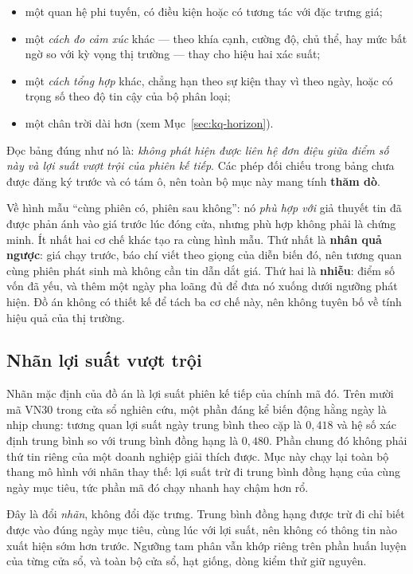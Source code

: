 \begin{itemize}[nosep]
  \item một quan hệ phi tuyến, có điều kiện hoặc có tương tác với đặc trưng giá;
  \item một \emph{cách đo cảm xúc} khác --- theo khía cạnh, cường độ, chủ thể, hay mức bất
        ngờ so với kỳ vọng thị trường --- thay cho hiệu hai xác suất;
  \item một \emph{cách tổng hợp} khác, chẳng hạn theo sự kiện thay vì theo ngày, hoặc có
        trọng số theo độ tin cậy của bộ phân loại;
  \item một chân trời dài hơn (xem Mục~\ref{sec:kq-horizon}).
\end{itemize}

Đọc bảng đúng như nó là: \emph{không phát hiện được liên hệ đơn điệu giữa điểm số này và
lợi suất vượt trội của phiên kế tiếp}. Các phép đối chiếu trong bảng chưa được đăng ký
trước và có tám ô, nên toàn bộ mục này mang tính \textbf{thăm dò}.

Về hình mẫu ``cùng phiên có, phiên sau không'': nó \emph{phù hợp với} giả thuyết tin đã
được phản ánh vào giá trước lúc đóng cửa, nhưng phù hợp không phải là chứng minh. Ít nhất
hai cơ chế khác tạo ra cùng hình mẫu. Thứ nhất là \textbf{nhân quả ngược}: giá chạy trước,
báo chí viết theo giọng của diễn biến đó, nên tương quan cùng phiên phát sinh mà không cần
tin dẫn dắt giá. Thứ hai là \textbf{nhiễu}: điểm số vốn đã yếu, và thêm một ngày pha loãng
đủ để đưa nó xuống dưới ngưỡng phát hiện. Đồ án không có thiết kế để tách ba cơ chế này,
nên không tuyên bố về tính hiệu quả của thị trường.

\subsection{Nhãn lợi suất vượt trội}
\label{sec:kq-excess}

Nhãn mặc định của đồ án là lợi suất phiên kế tiếp của chính mã đó. Trên mười mã VN30 trong
cửa sổ nghiên cứu, một phần đáng kể biến động hằng ngày là nhịp chung: tương quan lợi suất
ngày trung bình theo cặp là $0{,}418$ và hệ số xác định trung bình so với trung bình đồng
hạng là $0{,}480$. Phần chung đó không phải thứ tin riêng của một doanh nghiệp giải thích
được. Mục này chạy lại toàn bộ thang mô hình với nhãn thay thế: lợi suất trừ đi trung bình
đồng hạng của cùng ngày mục tiêu, tức phần mã đó chạy nhanh hay chậm hơn rổ.

Đây là đổi \emph{nhãn}, không đổi đặc trưng. Trung bình đồng hạng được trừ đi chỉ biết
được vào đúng ngày mục tiêu, cùng lúc với lợi suất, nên không có thông tin nào xuất hiện
sớm hơn trước. Ngưỡng tam phân vẫn khớp riêng trên phần huấn luyện của từng cửa sổ, và
toàn bộ cửa sổ, hạt giống, dòng kiểm thử giữ nguyên.

